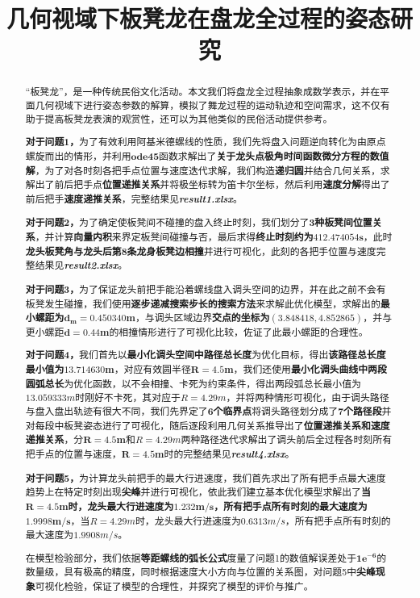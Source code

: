 \documentclass[withoutpreface,bwprint]{cumcmthesis} %
\title{几何视域下板凳龙在盘龙全过程的姿态研究}
\begin{document}
 \maketitle
 \begin{abstract}
“板凳龙”，是一种传统民俗文化活动。本文我们将盘龙全过程抽象成数学表示，并在平面几何视域下进行姿态参数的解算，模拟了舞龙过程的运动轨迹和空间需求，这不仅有助于提高板凳龙表演的观赏性，还可以为其他类似的民俗活动提供参考。

\textbf{对于问题1，}为了有效利用阿基米德螺线的性质，我们先将盘入问题逆向转化为由原点螺旋而出的情形，并利用$\bm{ode45}$函数求解出了\textbf{关于龙头点极角时间函数微分方程的数值解}，为了对各时刻各把手点位置与速度迭代求解，我们构造\textbf{递归圆}并结合几何关系，求解出了前后把手点\textbf{位置递推关系}并将极坐标转为笛卡尔坐标，然后利用\textbf{速度分解}得出了前后把手\textbf{速度递推关系}，完整结果见\textbf{\textit{result1.xlsx}}。

\textbf{对于问题2，}为了确定使板凳间不碰撞的盘入终止时刻，我们划分了\textbf{$\bm{3}$种板凳间位置关系}，并计算\textbf{向量内积}来界定板凳间碰撞与否，最后求得\textbf{终止时刻约为$\bm{412.474054s}$}，此时\textbf{龙头板凳角与龙头后第8条龙身板凳边相撞}并进行可视化，此刻的各把手位置与速度完整结果见\textbf{\textit{result2.xlsx}}。

\textbf{对于问题3，}为了保证龙头前把手能沿着螺线盘入调头空间的边界，并在此之前不会有板凳发生碰撞，我们使用\textbf{逐步递减搜索步长的搜索方法}来求解此优化模型，求解出的\textbf{最小螺距为$\bm{d_m=0.450340m}$}，与调头区域边界\textbf{交点的坐标为$\bm{(3.848418, 4.852865)}$}，并与更小螺距$\bm{d=0.44m}$的相撞情形进行了可视化比较，佐证了此最小螺距的合理性。

\textbf{对于问题4，}我们首先以\textbf{最小化调头空间中路径总长度}为优化目标，得出\textbf{该路径总长度最小值为$\bm{13.714630m}$}，对应有效圆半径$\bm{R=4.5m}$，我们还使用\textbf{最小化调头曲线中两段圆弧总长}为优化函数，以不会相撞、卡死为约束条件，得出两段弧总长最小值为$13.059333m$时刚好不卡死，其对应于$R=4.29m$，并将两种情形可视化，由于调头路径与盘入盘出轨迹有很大不同，我们先界定了\textbf{6个临界点}将调头路径划分成了\textbf{7个路径段}并对每段中板凳姿态进行了可视化，随后逐段利用几何关系推导出了\textbf{位置递推关系和速度递推关系}，分$\bm{R=4.5m}$和$R=4.29m$两种路径迭代求解出了调头前后全过程各时刻所有把手点的位置与速度，$\bm{R=4.5m}$时的完整结果见\textbf{\textit{result4.xlsx}}。

\textbf{对于问题5，}为计算龙头前把手的最大行进速度，我们首先求出了所有把手点最大速度趋势上在特定时刻出现\textbf{尖峰}并进行可视化，依此我们建立基本优化模型求解出了\textbf{当$\bm{R=4.5m}$时，龙头最大行进速度为$\bm{1.232m/s}$，所有把手点所有时刻的最大速度为$\bm{1.9998m/s}$}，当$R=4.29m$时，龙头最大行进速度为$0.6313m/s$，所有把手点所有时刻的最大速度为$1.9908m/s$。

在模型检验部分，我们依据\textbf{等距螺线的弧长公式}度量了问题1的数值解误差处于$\bm{1e^{-6}}$的数量级，具有极高的精度，同时根据速度大小方向与位置的关系图，对问题5中\textbf{尖峰现象}可视化检验，保证了模型的合理性，并探究了模型的评价与推广。


\end{abstract}
\end{document}

